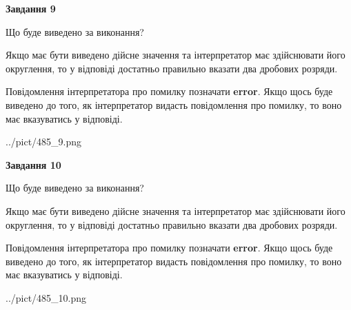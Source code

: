 \documentclass[12pt, ukrainian]{article}
\begin{document}
{\begin {Large}
{\begin {center}\textbf{Завдання 9}\end {center}}\par
Що буде виведено за виконання? \par

Якщо має бути виведено дійсне значення та інтерпретатор має здійснювати його округлення, 
то у відповіді достатньо правильно вказати два дробових розряди.

Повідомлення інтерпретатора про помилку позначати \textbf{error}.
Якщо щось буде виведено до того, як інтерпретатор видасть повідомлення про помилку, 
то воно має вказуватись у відповіді. \par

\begin{center}
	{../pict/485_9.png}
\end{center}
\newpage

{\begin {center}\textbf{Завдання 10}\end {center}}\par
Що буде виведено за виконання? \par

Якщо має бути виведено дійсне значення та інтерпретатор має здійснювати його округлення, 
то у відповіді достатньо правильно вказати два дробових розряди.

Повідомлення інтерпретатора про помилку позначати \textbf{error}.
Якщо щось буде виведено до того, як інтерпретатор видасть повідомлення про помилку, 
то воно має вказуватись у відповіді. \par

\begin{center}
	{../pict/485_10.png}
\end{center}
\newpage

\end {Large}}
\end{document}
